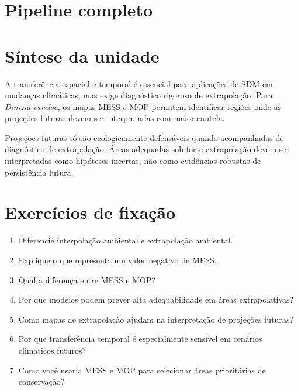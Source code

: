 \section{Pipeline completo}


\section{Síntese da unidade}

A transferência espacial e temporal é essencial para aplicações de SDM em mudanças climáticas, mas exige diagnóstico rigoroso de extrapolação. Para \textit{Dinizia excelsa}, os mapas MESS e MOP permitem identificar regiões onde as projeções futuras devem ser interpretadas com maior cautela.

\begin{conceito}[title={\faBook\quad Mensagem central}]
	Projeções futuras só são ecologicamente defensáveis quando acompanhadas de diagnóstico de extrapolação. Áreas adequadas sob forte extrapolação devem ser interpretadas como hipóteses incertas, não como evidências robustas de persistência futura.
\end{conceito}

\section{Exercícios de fixação}

\begin{enumerate}
	\item Diferencie interpolação ambiental e extrapolação ambiental.
	\item Explique o que representa um valor negativo de MESS.
	\item Qual a diferença entre MESS e MOP?
	\item Por que modelos podem prever alta adequabilidade em áreas extrapolativas?
	\item Como mapas de extrapolação ajudam na interpretação de projeções futuras?
	\item Por que transferência temporal é especialmente sensível em cenários climáticos futuros?
	\item Como você usaria MESS e MOP para selecionar áreas prioritárias de conservação?
\end{enumerate}



